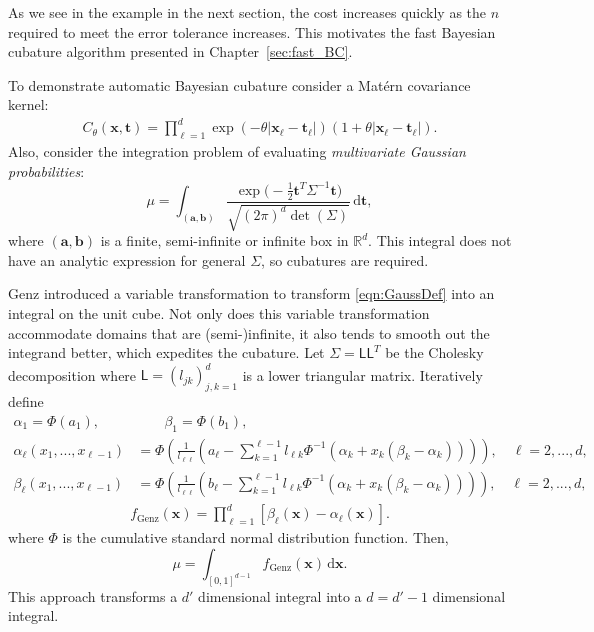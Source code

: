 \documentclass{iitthesis}          %
\newcommand{\bm}[1]{\boldsymbol{#1}}
\newcommand{\mSigma}{\mathsf{\Sigma}}
\newcommand{\dif}[1]{\text{d}{#1}}
\newcommand{\reals}{\mathbb{R}}
\newcommand{\va}{\bm{a}}
\newcommand{\vb}{\bm{b}}
\newcommand{\vt}{\bm{t}}
\newcommand{\vx}{\bm{x}}
\newcommand{\dvx}{\dif{\bm{x}}}
\newcommand{\dvt}{\dif{\bm{t}}}
\newcommand{\mL}{\mathsf{L}}
\begin{document}
As we see in the example in the next section, the cost increases quickly as the $n$ required to meet the error tolerance increases.  This motivates the fast Bayesian cubature algorithm presented in Chapter~\ref{sec:fast_BC}.


 \label{MVN_example}

To demonstrate automatic Bayesian cubature consider a Mat\'ern covariance kernel:
\begin{align}
\label{eqn:matern_kernel}
C_{\theta}(\vx, \vt) = \prod_{\ell=1}^d \exp(-\theta|\vx_\ell-\vt_\ell|)(1+\theta |\vx_\ell-\vt_\ell|).
\end{align}
Also, consider the integration problem of evaluating  \emph{multivariate Gaussian probabilities}:
\begin{equation}
\label{eqn:GaussDef}
\mu = \int_{(\va,\vb)} \frac{\exp\bigl(- \frac 12 \vt^T \mSigma^{-1} \vt \bigr)}{\sqrt{(2 \pi)^d \det(\mSigma)}} \, \dvt,
\end{equation}
where $(\va,\vb)$ is a finite, semi-infinite or infinite box in $\reals^d$.  This integral does not have an analytic expression for general $\mSigma$, so cubatures are required.  

Genz \cite{Gen93} introduced a variable transformation to transform \eqref{eqn:GaussDef} into an integral on the unit cube.  Not only does this variable transformation accommodate domains that are (semi-)infinite, it also tends to smooth out the integrand better, which expedites the cubature.  Let $\mSigma= \mL \mL^T$ be the Cholesky decomposition where $\mL = (l_{jk})_{j,k=1}^d$ is a lower triangular matrix.  Iteratively define
\begin{align*}
\alpha_1 = \Phi(a_1), 
&\qquad
\beta_1 = \Phi(b_1),
\\
\alpha_\ell(x_1,...,x_{\ell-1}) &= 
\Phi
\left(
\frac{1}{l_{\ell \ell}} 
\left(
a_\ell - \sum_{k=1}^{\ell-1} l_{\ell k} \Phi^{-1}(\alpha_k + x_k(\beta_k-\alpha_k))
\right)
\right), \quad \ell=2,...,d,
\\
\beta_\ell(x_1,...,x_{\ell-1}) &= 
\Phi
\left(
\frac{1}{l_{\ell\ell}} 
\left(
b_\ell - \sum_{k=1}^{\ell-1} l_{\ell k} \Phi^{-1}(\alpha_k + x_k(\beta_k-\alpha_k))
\right)
\right), \quad \ell=2,...,d,
\end{align*}
\begin{align}
\label{eqn:fGenzdef}
f_{\text{Genz}}(\vx) = \prod_{\ell=1}^d [\beta_\ell(\vx) - \alpha_\ell(\vx)].
\end{align}
where $\Phi$ is the cumulative standard normal distribution function.
Then, $$\mu = \int_{[0,1]^{d-1}} f_{\text{Genz}}(\vx) \, \dvx.$$
This approach transforms a $d'$ dimensional integral into a $d=d'-1$ dimensional integral.
\end{document}
